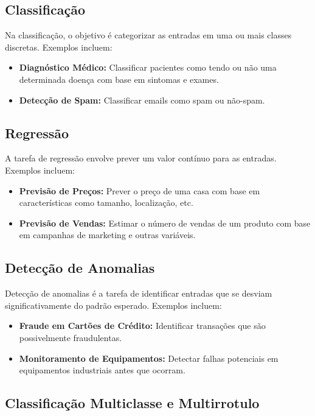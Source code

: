 \documentclass{article}
\begin{document}
\subsection{Classificação}

Na classificação, o objetivo é categorizar as entradas em uma ou mais classes discretas. Exemplos incluem:

\begin{itemize}
    \item \textbf{Diagnóstico Médico:} Classificar pacientes como tendo ou não uma determinada doença com base em sintomas e exames.
    \item \textbf{Detecção de Spam:} Classificar emails como spam ou não-spam.
\end{itemize}

\subsection{Regressão}

A tarefa de regressão envolve prever um valor contínuo para as entradas. Exemplos incluem:

\begin{itemize}
    \item \textbf{Previsão de Preços:} Prever o preço de uma casa com base em características como tamanho, localização, etc.
    \item \textbf{Previsão de Vendas:} Estimar o número de vendas de um produto com base em campanhas de marketing e outras variáveis.
\end{itemize}

\subsection{Detecção de Anomalias}

Detecção de anomalias é a tarefa de identificar entradas que se desviam significativamente do padrão esperado. Exemplos incluem:

\begin{itemize}
    \item \textbf{Fraude em Cartões de Crédito:} Identificar transações que são possivelmente fraudulentas.
    \item \textbf{Monitoramento de Equipamentos:} Detectar falhas potenciais em equipamentos industriais antes que ocorram.
\end{itemize}

\subsection{Classificação Multiclasse e Multirrotulo}
\end{document}
